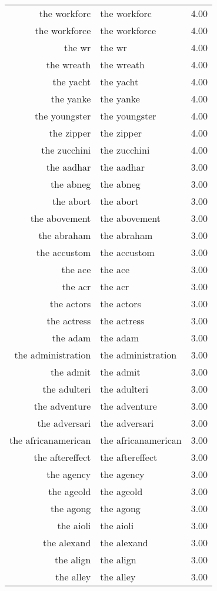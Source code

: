 \begin{table}[ht]
\begin{tabular}{rlr}
  the workforc & the workforc & 4.00 \\ 
  the workforce & the workforce & 4.00 \\ 
  the wr & the wr & 4.00 \\ 
  the wreath & the wreath & 4.00 \\ 
  the yacht & the yacht & 4.00 \\ 
  the yanke & the yanke & 4.00 \\ 
  the youngster & the youngster & 4.00 \\ 
  the zipper & the zipper & 4.00 \\ 
  the zucchini & the zucchini & 4.00 \\ 
  the aadhar & the aadhar & 3.00 \\ 
  the abneg & the abneg & 3.00 \\ 
  the abort & the abort & 3.00 \\ 
  the abovement & the abovement & 3.00 \\ 
  the abraham & the abraham & 3.00 \\ 
  the accustom & the accustom & 3.00 \\ 
  the ace & the ace & 3.00 \\ 
  the acr & the acr & 3.00 \\ 
  the actors & the actors & 3.00 \\ 
  the actress & the actress & 3.00 \\ 
  the adam & the adam & 3.00 \\ 
  the administration & the administration & 3.00 \\ 
  the admit & the admit & 3.00 \\ 
  the adulteri & the adulteri & 3.00 \\ 
  the adventure & the adventure & 3.00 \\ 
  the adversari & the adversari & 3.00 \\ 
  the africanamerican & the africanamerican & 3.00 \\ 
  the aftereffect & the aftereffect & 3.00 \\ 
  the agency & the agency & 3.00 \\ 
  the ageold & the ageold & 3.00 \\ 
  the agong & the agong & 3.00 \\ 
  the aioli & the aioli & 3.00 \\ 
  the alexand & the alexand & 3.00 \\ 
  the align & the align & 3.00 \\ 
  the alley & the alley & 3.00 \\ 

\end{tabular}
\end{table}
